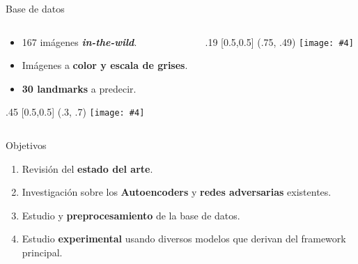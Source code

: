 \documentclass[aspectratio=43]{beamer}
\renewcommand{\cite}[1]{\footnote<.->[frame]{\fullcite{#1}}}
\newcommand{\absimage}[4][0.5,0.5]{%
	\begin{textblock}{#3}%
		[#1]%
		(#2)%
		\texttt{[image: \#4]}%
\end{textblock}}
\begin{document}

\begin{frame}[t]{Base de datos}
  \begin{columns}[onlytextwidth]
    \begin{column}{.5\textwidth}
      \begin{itemize}
        \item 167 imágenes \textbf{\textit{in-the-wild}}.
        \item Imágenes a \textbf{color y escala de grises}.
        \item \textbf{30 landmarks} a predecir.
      \end{itemize}
      \absimage{.3, .7}{.45}{imgs/EjemplosBD.png}
    \end{column}
    \begin{column}{.5\textwidth}
      \absimage{.75, .49}{.19}{imgs/vertical.png}
    \end{column}
  \end{columns}
\end{frame}


\begin{frame}{Objetivos}
  \begin{enumerate}
    \item Revisión del \textbf{estado del arte}.
    \item Investigación sobre los \textbf{Autoencoders} y \textbf{redes adversarias} existentes.
    \item Estudio y \textbf{preprocesamiento} de la base de datos.
    \item Estudio \textbf{experimental} usando diversos modelos que derivan del framework principal.
  \end{enumerate}
\end{frame}
\end{document}
